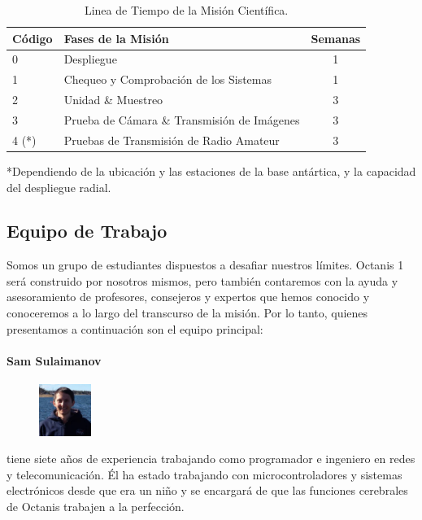 \documentclass[a4paper,12pt]{article}
\begin{document}
\begin{table}[h!]
\centering
\begin{tabular}{ l | l | c }
\bfseries{Código} & \bfseries{Fases de la Misión} & \bfseries{Semanas} \\
\hline

0 & Despliegue & 1 \\
1 & Chequeo y Comprobación de los Sistemas & 1 \\
2 & Unidad \& Muestreo & 3 \\
3 & Prueba de Cámara \& Transmisión de Imágenes  & 3 \\
4 (*)& Pruebas de Transmisión de Radio Amateur  & 3 \\

\end{tabular}
\caption{Linea de Tiempo de la Misión Científica.}
*Dependiendo de la ubicación y las estaciones de la base antártica, y la capacidad del despliegue radial.

\end{table}

\pagebreak

\subsection{Equipo de Trabajo}

Somos un grupo de estudiantes dispuestos a desafiar nuestros límites. Octanis 1 será construido por nosotros mismos, pero también contaremos con la ayuda y asesoramiento de profesores, consejeros y expertos que hemos conocido y conoceremos a lo largo del transcurso de la misión. Por lo tanto, quienes presentamos a continuación son el equipo principal:


\paragraph{Sam Sulaimanov} 
\begin{figure}
    \centering
    \vspace{-13pt}
    \includegraphics[width=0.15\textwidth]{sam}
\end{figure} tiene siete años de experiencia trabajando como programador e ingeniero en redes y  telecomunicación. Él ha estado trabajando con microcontroladores y sistemas electrónicos desde que era un niño y se encargará de que las funciones cerebrales de Octanis trabajen a la perfección.
\\ \\
\end{document}
